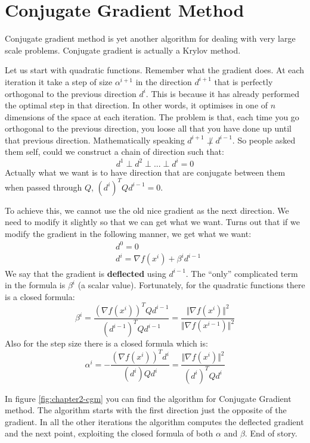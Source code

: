\section{Conjugate Gradient Method}
\par Conjugate gradient method is yet another algorithm for dealing with very large scale problems. Conjugate gradient is actually a Krylov method.
\par Let us start with quadratic functions. Remember what the gradient does. At each iteration it take a step of size $\alpha^{i+1}$ in the direction $d^{i+1}$ that is perfectly orthogonal to the previous direction $d^i$. This is because it has already performed the optimal step in that direction. In other words, it optimises in one of $n$ dimensions of the space at each iteration. The problem is that, each time you go orthogonal to the previous direction, you loose all that you have done up until that previous direction. Mathematically speaking $d^{i+1} \not \perp d^{i-1}$. So people asked them self, could we construct a chain of direction such that:
\begin{equation}
    d^1 \perp d^2 \perp ... \perp d^i = 0
\end{equation}
Actually what we want is to have direction that are conjugate between them when passed through $Q$, $(d^i)^T Q d^{i-1} = 0$.
\par To achieve this, we cannot use the old nice gradient as the next direction. We need to modify it slightly so that we can get what we want. Turns out that if we modify the gradient in the following manner, we get what we want:
\begin{align}
    &d^0 = 0\\
    &d^i = \nabla f(x^i) + \beta^i d^{i-1}
\end{align}
We say that the gradient is \textbf{deflected} using $d^{i-1}$. The ``only'' complicated term in the formula is $\beta^i$ (a scalar value). Fortunately, for the quadratic functions there is a closed formula:
\begin{equation}
    \beta^i = \frac{(\nabla f(x^i))^T Q d^{i-1}}{(d^{i-1})^T Q d^{i-1}} = \frac{\Vert \nabla f(x^i) \Vert^2}{\Vert \nabla f(x^{i-1}) \Vert^2}
\end{equation}
Also for the step size there is a closed formula which is:
\begin{equation}
    \alpha^i = - \frac{(\nabla f(x^i))^T d^i}{(d^i) Q d^i} = \frac{\Vert \nabla f(x^i) \Vert^2}{(d^i)^T Q d^i}
\end{equation}
\par In figure \ref{fig:chapter2-cgm} you can find the algorithm for Conjugate Gradient method. The algorithm starts with the first direction just the opposite of the gradient. In all the other iterations the algorithm computes the deflected gradient and the next point, exploiting the closed formula of both $\alpha$ and $\beta$. End of story.

